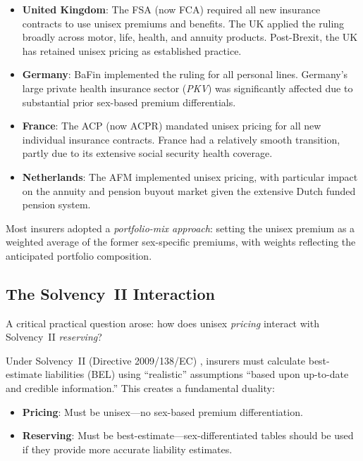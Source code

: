 \documentclass[12pt,a4paper]{article}
\begin{document}
\begin{itemize}
  \item \textbf{United Kingdom}: The FSA (now FCA) required all new insurance contracts to use unisex premiums and benefits. The UK applied the ruling broadly across motor, life, health, and annuity products. Post-Brexit, the UK has retained unisex pricing as established practice.

  \item \textbf{Germany}: BaFin implemented the ruling for all personal lines. Germany's large private health insurance sector (\emph{PKV}) was significantly affected due to substantial prior sex-based premium differentials.

  \item \textbf{France}: The ACP (now ACPR) mandated unisex pricing for all new individual insurance contracts. France had a relatively smooth transition, partly due to its extensive social security health coverage.

  \item \textbf{Netherlands}: The AFM implemented unisex pricing, with particular impact on the annuity and pension buyout market given the extensive Dutch funded pension system.
\end{itemize}

Most insurers adopted a \emph{portfolio-mix approach}: setting the unisex premium as a weighted average of the former sex-specific premiums, with weights reflecting the anticipated portfolio composition.

\subsection{The Solvency~II Interaction}
\label{subsec:solvency-ii}

A critical practical question arose: how does unisex \emph{pricing} interact with Solvency~II \emph{reserving}?

Under Solvency~II (Directive 2009/138/EC) \cite{solvencyii2009}, insurers must calculate best-estimate liabilities (BEL) using ``realistic'' assumptions ``based upon up-to-date and credible information.'' This creates a fundamental duality:

\begin{itemize}
  \item \textbf{Pricing}: Must be unisex---no sex-based premium differentiation.
  \item \textbf{Reserving}: Must be best-estimate---sex-differentiated tables should be used if they provide more accurate liability estimates.
\end{itemize}
\end{document}
